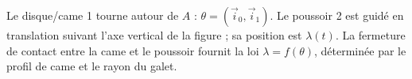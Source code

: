 \begin{corrigebox}
Le disque/came 1 tourne autour de $A$ :
$\theta=(\vec i_0,\vec i_1)$. Le poussoir 2 est guidé en translation suivant
l'axe vertical de la figure ; sa position est $\lambda(t)$. La fermeture de
contact entre la came et le poussoir fournit la loi
$\lambda=f(\theta)$, déterminée par le profil de came et le rayon du galet.
\end{corrigebox}
